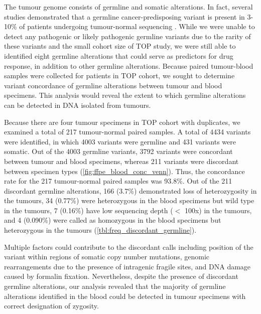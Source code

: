 The tumour genome consists of germline and somatic alterations. In fact, several studies demonstrated that a germline cancer-predisposing variant is present in 3-10\% of patients undergoing tumour-normal sequencing \cite{Raymond2016,Meric-Bernstam2016,Schrader2015,Jones2015}. While we were unable to detect any pathogenic or likely pathogenic germline variants due to the rarity of these variants and the small cohort size of TOP study, we were still able to identified eight germline alterations that could serve as predictors for drug response, in addition to other germline alterations. Because paired tumour-blood samples were collected for patients in TOP cohort, we sought to determine variant concordance of germline alterations between tumour and blood specimens. This analysis would reveal the extent to which germline alterations can be detected in DNA isolated from tumours.

Because there are four tumour specimens in TOP cohort with duplicates, we examined a total of 217 tumour-normal paired samples. A total of 4434 variants were identified, in which 4003 variants were germline and 431 variants were somatic. Out of the 4003 germline variants, 3792 variants were concordant between tumour and blood specimens, whereas 211 variants were discordant between specimen types (\autoref{fig:ffpe_blood_conc_venn}). Thus, the concordance rate for the 217 tumour-normal paired samples was 93.8\%. Out of the 211 discordant germline alterations, 166 (3.7\%) demonstrated loss of heterozygosity in the tumours, 34 (0.77\%) were heterozygous in the blood specimens but wild type in the tumours, 7 (0.16\%) have low sequencing depth ($<$ 100x) in the tumours, and 4 (0.090\%) were called as homozygous in the blood specimens but heterozygous in the tumours (\autoref{tbl:freq_discordant_germline}).

Multiple factors could contribute to the discordant calls including position of the variant within regions of somatic copy number mutations, genomic rearrangements due to the presence of intragenic fragile sites, and DNA damage caused by formalin fixation. Nevertheless, despite the presence of discordant germline alterations, our analysis revealed that the majority of germline alterations identified in the blood could be detected in tumour specimens with correct designation of zygosity.


